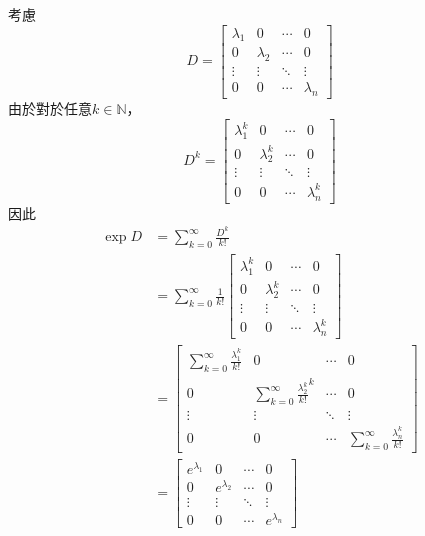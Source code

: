 \documentclass[12pt]{article}
\begin{document}
    考慮$$D=\begin{bmatrix}
        \lambda_1&0&\cdots&0\\
        0&\lambda_2&\cdots&0\\
        \vdots&\vdots&\ddots&\vdots\\
        0&0&\cdots&\lambda_n
    \end{bmatrix}$$由於對於任意$k\in\mathbb{N}$，$$D^k=\begin{bmatrix}
        \lambda_1^k&0&\cdots&0\\
        0&\lambda_2^k&\cdots&0\\
        \vdots&\vdots&\ddots&\vdots\\
        0&0&\cdots&\lambda_n^k
    \end{bmatrix}$$因此\begin{align*}
        \exp{D}&=\sum_{k=0}^{\infty}\frac{D^k}{k!}\\
        &=\sum_{k=0}^{\infty}\frac{1}{k!}\begin{bmatrix}
            \lambda_1^k&0&\cdots&0\\
            0&\lambda_2^k&\cdots&0\\
            \vdots&\vdots&\ddots&\vdots\\
            0&0&\cdots&\lambda_n^k
        \end{bmatrix}\\
        &=\begin{bmatrix}
            \sum_{k=0}^{\infty}\frac{\lambda_1^k}{k!}&0&\cdots&0\\
            0&\sum_{k=0}^{\infty}\frac{\lambda_2^k}{k!}^k&\cdots&0\\
            \vdots&\vdots&\ddots&\vdots\\
            0&0&\cdots&\sum_{k=0}^{\infty}\frac{\lambda_n^k}{k!}
        \end{bmatrix}\\
        &=\begin{bmatrix}
            e^{\lambda_1}&0&\cdots&0\\
            0&e^{\lambda_2}&\cdots&0\\
            \vdots&\vdots&\ddots&\vdots\\
            0&0&\cdots&e^{\lambda_n}
        \end{bmatrix}
    \end{align*}
\end{document}
